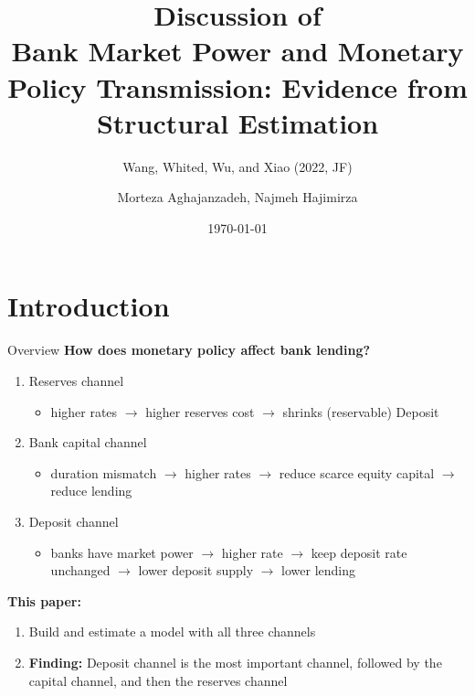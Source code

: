 \documentclass{beamer}
\title[Monetary Policy
Transmission]{Discussion of\\ \textbf{Bank Market Power and Monetary Policy Transmission: Evidence from Structural Estimation}}
\subtitle{Wang, Whited, Wu, and Xiao (2022, JF)}
\author[Morteza, Najmeh]{Morteza Aghajanzadeh, Najmeh Hajimirza}
\institute[HH Finance]{Households Finance}
\date{\today}
\begin{document}
\begin{frame}
    \titlepage
\end{frame}


\section{Introduction}

\begin{frame}{Overview}
    \textbf{How does monetary policy affect bank lending?}\\
    \begin{enumerate}
        \item Reserves channel \citep{bernanke1988credit}
        \begin{itemize}
            \item higher rates $\rightarrow$ higher reserves cost $\rightarrow$ shrinks (reservable) Deposit
        \end{itemize}
        \item Bank capital channel \citep{bolton2000equity}
        \begin{itemize}
            \item duration mismatch $\rightarrow$ higher rates $\rightarrow$ reduce scarce equity capital $\rightarrow$ reduce lending
        \end{itemize}
        \item Deposit channel \citep{drechsler2017deposits}
        \begin{itemize}
            \item banks have market power $\rightarrow$ higher rate $\rightarrow$ keep deposit rate unchanged $\rightarrow$ lower deposit supply $\rightarrow$ lower lending
        \end{itemize}
    \end{enumerate}
    \vspace{0.5cm}
    \textbf{This paper:} 
    \begin{enumerate}
        \item Build and estimate a model with all three channels
        \item \textbf{Finding:} Deposit channel is the most important channel, followed by the capital channel, and then the reserves channel
    \end{enumerate}
\end{frame}
    
\end{document}
